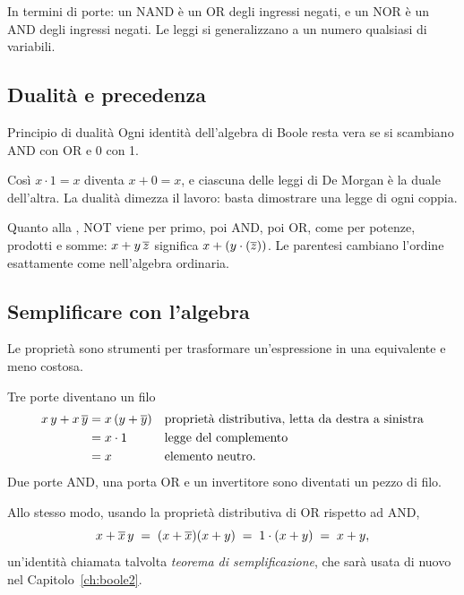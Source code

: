 \smallskip
In termini di porte: un NAND è un OR degli ingressi negati, e un NOR è un AND
degli ingressi negati. Le leggi si generalizzano a un numero qualsiasi di
variabili.

\subsection{Dualità e precedenza}

\begin{theorem}{Principio di dualità}
Ogni identità dell'algebra di Boole resta vera se si scambiano AND con OR e 0
con 1.
\end{theorem}

Così $x\cdot 1=x$ diventa $x+0=x$, e ciascuna delle leggi di De Morgan è la
duale dell'altra. La dualità dimezza il lavoro: basta dimostrare una legge di
ogni coppia.

Quanto alla , NOT viene per primo, poi AND, poi OR, come per
potenze, prodotti e somme: $x+y\,\overline{z}$ significa
$x+(y\cdot(\overline{z}))$. Le parentesi cambiano l'ordine esattamente come
nell'algebra ordinaria.

\subsection{Semplificare con l'algebra}

Le proprietà sono strumenti per trasformare un'espressione in una equivalente
e meno costosa.

\begin{example}{Tre porte diventano un filo}
\begin{align*}
x\,y+x\,\overline{y} &= x\,(y+\overline{y}) && \text{proprietà distributiva, letta da destra a sinistra}\\
 &= x\cdot 1 && \text{legge del complemento}\\
 &= x && \text{elemento neutro.}
\end{align*}
Due porte AND, una porta OR e un invertitore sono diventati un pezzo di filo.
\end{example}

Allo stesso modo, usando la proprietà distributiva di OR rispetto ad AND,
\begin{equation}\label{eq:b1:simp}
x+\overline{x}\,y \;=\; (x+\overline{x})(x+y) \;=\; 1\cdot(x+y) \;=\; x+y ,
\end{equation}
un'identità chiamata talvolta \emph{teorema di semplificazione}, che sarà usata
di nuovo nel Capitolo~\ref{ch:boole2}.

